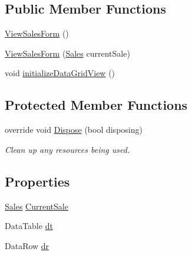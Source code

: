 \subsection*{Public Member Functions}
\begin{DoxyCompactItemize}
\item 
\hyperlink{class_health___assignment_1_1_view_sales_form_a873e22efceab47ff319742ca2a43c2ce}{View\+Sales\+Form} ()
\item 
\hyperlink{class_health___assignment_1_1_view_sales_form_a4d00d8c7d152311f399c3041d8cc3cc9}{View\+Sales\+Form} (\hyperlink{class_health___assignment_1_1_sales}{Sales} current\+Sale)
\item 
void \hyperlink{class_health___assignment_1_1_view_sales_form_a9f89a24f6c7d54c2c7067ccb60431f22}{initialize\+Data\+Grid\+View} ()
\end{DoxyCompactItemize}
\subsection*{Protected Member Functions}
\begin{DoxyCompactItemize}
\item 
override void \hyperlink{class_health___assignment_1_1_view_sales_form_a7789b9f9f3a037a48956b02ff90f656d}{Dispose} (bool disposing)
\begin{DoxyCompactList}\small\item\em Clean up any resources being used. \end{DoxyCompactList}\end{DoxyCompactItemize}
\subsection*{Properties}
\begin{DoxyCompactItemize}
\item 
\hyperlink{class_health___assignment_1_1_sales}{Sales} \hyperlink{class_health___assignment_1_1_view_sales_form_a02eded10d3c9652dd723d7ecd0219755}{Current\+Sale}
\item 
Data\+Table \hyperlink{class_health___assignment_1_1_view_sales_form_ab1c0ad6a9f09932e763d56f88c18e370}{dt}
\item 
Data\+Row \hyperlink{class_health___assignment_1_1_view_sales_form_a3faa3b216276c15d03b54699eab35491}{dr}
\end{DoxyCompactItemize}


